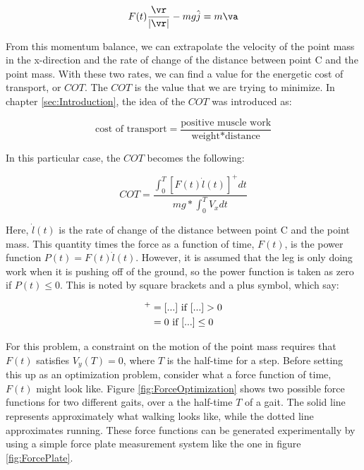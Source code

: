 \begin{equation}
F(t)\frac{\vr}{|\vr|}-mg\hat{j}=m\va
\label{eq:PointMassLMB}
\end{equation}

From this momentum balance, we can extrapolate the velocity of the point mass in the x-direction and the rate of change of the distance between point C and the point mass. With these two rates, we can find a value for the energetic cost of transport, or $COT$. The $COT$ is the value that we are trying to minimize. In chapter \ref{sec:Introduction}, the idea of the $COT$ was introduced as:

\begin{equation*}
\mbox{cost of transport}=\frac{\mbox{positive muscle work}}{\mbox{weight}*\mbox{distance}} 
\end{equation*}

In this particular case, the $COT$ becomes the following:

\begin{equation}
COT=\frac{\int_{0}^{T}[F(t)\dot{l}(t)]^{+}dt}{mg*\int_{0}^{T}V_{x}dt}
\label{eq:PoinMassCOT}
\end{equation}

Here, $\dot{l}(t)$ is the rate of change of the distance between point C and the point mass. This quantity times the force as a function of time, $F(t)$, is the power function $P(t) = F(t)\dot{l}(t)$. However, it is assumed that the leg is only doing work when it is pushing off of the ground, so the power function is taken as zero if $P(t) \leq 0$. This is noted by square brackets and a plus symbol, which say:

\begin{align}
[\mbox{...}]^{+} &= [\mbox{...}] \mbox{ if } [\mbox{...}] > 0 \notag \\
&= 0 \mbox{ if } [\mbox{...}] \leq 0 \notag
\label{eq:PowerBracketNotation}
\end{align}

For this problem, a constraint on the motion of the point mass requires that $F(t)$ satisfies $V_{y}(T) = 0$, where $T$ is the half-time for a step. Before setting this up as an optimization problem, consider what a force function of time, $F(t)$ might look like. Figure \ref{fig:ForceOptimization} shows two possible force functions for two different gaits, over a the half-time $T$ of a gait. The solid line represents approximately what walking looks like, while the dotted line approximates running. These force functions can be generated experimentally by using a simple force plate measurement system like the one in figure \ref{fig:ForcePlate}. 


